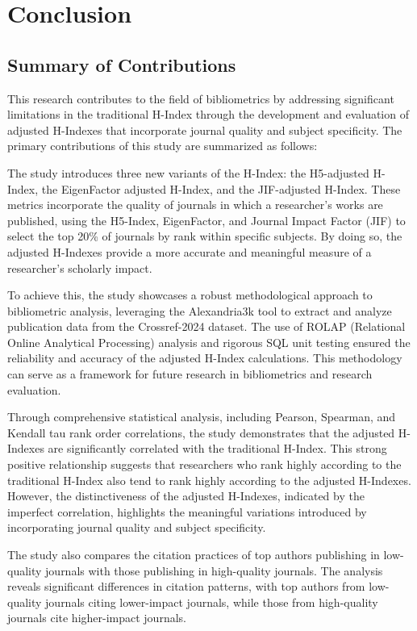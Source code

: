 \chapter{Conclusion}
\label{ch:conclusion}

\section{Summary of Contributions}

This research contributes to the field of bibliometrics by addressing
significant limitations in the traditional H-Index through the development and
evaluation of adjusted H-Indexes that incorporate journal quality and subject
specificity. The primary contributions of this study are summarized as follows:

The study introduces three new variants of the H-Index: the H5-adjusted
H-Index, the EigenFactor adjusted H-Index, and the JIF-adjusted H-Index. These
metrics incorporate the quality of journals in which a researcher’s works are
published, using the H5-Index, EigenFactor, and Journal Impact Factor (JIF) to
select the top 20\% of journals by rank within specific subjects. By doing so,
the adjusted H-Indexes provide a more accurate and meaningful measure of a
researcher’s scholarly impact.

To achieve this, the study showcases a robust methodological approach to
bibliometric analysis, leveraging the Alexandria3k tool to extract and analyze
publication data from the Crossref-2024 dataset. The use of ROLAP (Relational
Online Analytical Processing) analysis and rigorous SQL unit testing ensured
the reliability and accuracy of the adjusted H-Index calculations. This
methodology can serve as a framework for future research in bibliometrics and
research evaluation.

Through comprehensive statistical analysis, including Pearson, Spearman, and
Kendall tau rank order correlations, the study demonstrates that the adjusted
H-Indexes are significantly correlated with the traditional H-Index. This
strong positive relationship suggests that researchers who rank highly
according to the traditional H-Index also tend to rank highly according to the
adjusted H-Indexes. However, the distinctiveness of the adjusted H-Indexes,
indicated by the imperfect correlation, highlights the meaningful variations
introduced by incorporating journal quality and subject specificity.

The study also compares the citation practices of top authors publishing in
low-quality journals with those publishing in high-quality journals. The
analysis reveals significant differences in citation patterns, with top authors
from low-quality journals citing lower-impact journals, while those from
high-quality journals cite higher-impact journals.

